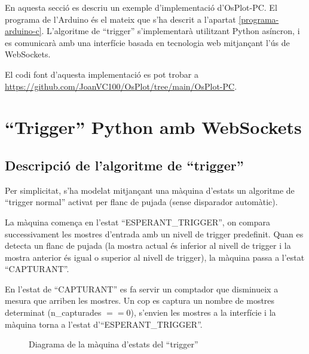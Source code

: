 \documentclass{tfgitic}[2023/06/30]
\begin{document}
En aquesta secció es descriu un exemple d'implementació
d'OsPlot-PC. El programa de l'Arduino és el mateix que s'ha descrit a
l'apartat \ref{programa-arduino-c}. L'algoritme de ``trigger''
s'implementarà utilitzant Python asíncron, i es comunicarà amb una
interfície basada en tecnologia web mitjançant l'ús de WebSockets.

El codi font d'aquesta implementació es pot trobar a
\url{https://github.com/JoanVC100/OsPlot/tree/main/OsPlot-PC}.

\section{``Trigger'' Python amb WebSockets}

\subsection{Descripció de l'algoritme de ``trigger''}
\label{subsec:maquina-trigger}

Per simplicitat, s'ha modelat mitjançant una màquina d'estats un
algoritme de ``trigger normal'' activat per flanc de pujada (sense
disparador automàtic).

La màquina comença en l'estat ``ESPERANT\_TRIGGER'', on compara
successivament les mostres d'entrada amb un nivell de trigger
predefinit. Quan es detecta un flanc de pujada (la mostra actual és
inferior al nivell de trigger i la mostra anterior és igual o superior
al nivell de trigger), la màquina passa a l'estat ``CAPTURANT''.

En l'estat de ``CAPTURANT'' es fa servir un comptador que disminueix a
mesura que arriben les mostres. Un cop es captura un nombre de mostres
determinat (n\_capturades $== 0$), s'envien les mostres a la
interfície i la màquina torna a l'estat d'``ESPERANT\_TRIGGER''.

\begin{figure}[!hb]
      \centering
      \caption{Diagrama de la màquina d'estats del ``trigger''}
\end{figure}
\end{document}
